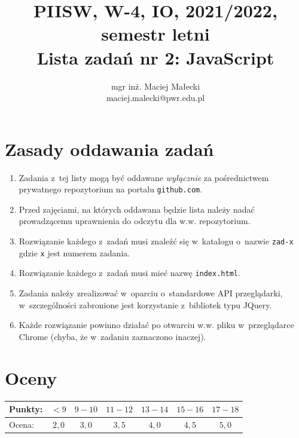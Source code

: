 \documentclass[12pt]{article}
\title{PIISW, W-4, IO, 2021/2022, semestr letni\\Lista zadań nr 2: JavaScript}
\author{mgr inż. Maciej Małecki\\\small{maciej.malecki@pwr.edu.pl}}
\begin{document}
    \maketitle

    \section*{Zasady oddawania zadań}
        \begin{enumerate}
            \item Zadania z~tej listy mogą być oddawane \emph{wyłącznie} za pośrednictwem prywatnego repozytorium na portalu \texttt{github.com}.
            \item Przed zajęciami, na których oddawana będzie lista należy nadać prowadzącemu uprawnienia do odczytu dla w.w. repozytorium.
            \item Rozwiązanie każdego z~zadań musi znaleźć się w~katalogu o~nazwie \texttt{zad-x} gdzie \texttt{x} jest numerem zadania.
            \item Rozwiązanie każdego z~zadań musi mieć nazwę \texttt{index.html}.
            \item Zadania należy zrealizować w~oparciu o~standardowe API przeglądarki, w~szczególności zabronione jest korzystanie z~bibliotek typu JQuery.
            \item Każde rozwiązanie powinno działać po otwarciu w.w. pliku w~przeglądarce Chrome (chyba, że w~zadaniu zaznaczono inaczej).
        \end{enumerate}

    \section*{Oceny}
    \begin{tabular}{|l|c|c|c|c|c|c|}
        \hline
        Punkty: & $<9$ & $9-10$ & $11-12$ & $13-14$ & $15-16$ & $17-18$\\
        \hline
        Ocena:  & $2,0$ & $3,0$ & $3,5$ & $4,0$ & $4,5$ & $5,0$\\
        \hline
    \end{tabular}
\end{document}
